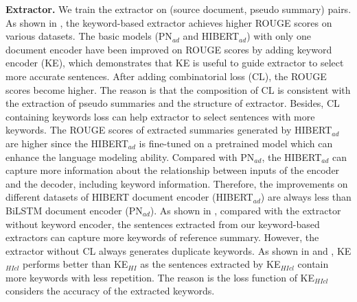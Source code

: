 \textbf{Extractor.}
We train the extractor on (source document, pseudo summary) pairs.
As shown in , the keyword-based extractor 
achieves higher ROUGE scores on various datasets.
The basic models (PN$_{ad}$ and HIBERT$_{ad}$) with only one document encoder 
have been improved on ROUGE scores by adding keyword encoder (KE),
which demonstrates that KE is useful to guide extractor to select more accurate sentences.
After adding combinatorial loss (CL), the ROUGE scores
become higher.
The reason is that the composition of CL is consistent with 
the extraction of pseudo summaries and the structure of extractor.
Besides, CL containing keywords loss can help extractor to select sentences with more keywords.
The ROUGE scores of extracted summaries generated by HIBERT$_{ad}$
are higher since the HIBERT$_{ad}$ is fine-tuned on a pretrained model which
can enhance the language modeling ability.
Compared with PN$_{ad}$, the HIBERT$_{ad}$ can capture
more information about the relationship between inputs of the encoder and the decoder,
including keyword information.
Therefore, the improvements on different datasets of 
HIBERT document encoder (HIBERT$_{ad}$)
are always less than 
BiLSTM document encoder (PN$_{ad}$).
As shown in ,
compared with the extractor without keyword encoder,
the sentences extracted from our keyword-based extractors can capture
more keywords of reference summary.
However, the extractor without CL always generates duplicate keywords.
As shown in  and , 
KE$_{HIcl}$ 
performs better than KE$_{HI}$ as the sentences extracted by KE$_{HIcl}$
contain more keywords with less repetition.
The reason is the loss function of KE$_{HIcl}$
considers the accuracy of the extracted keywords. 

